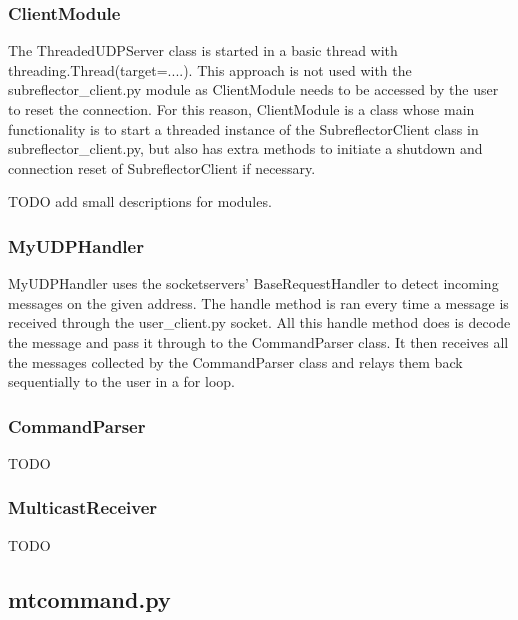 \documentclass{article}
\begin{document}
\subsubsection{ClientModule}
The ThreadedUDPServer class is started in a basic thread with threading.Thread(target=....). This approach is not used with the subreflector\_client.py  module as ClientModule needs to be accessed by the user to reset the connection. For this reason, ClientModule is a class whose main functionality is to start a threaded instance of the SubreflectorClient class in subreflector\_client.py, but also has extra methods to initiate a shutdown and connection reset of SubreflectorClient if necessary.

TODO add small descriptions for modules.  %

\subsubsection{MyUDPHandler}

MyUDPHandler uses the socketservers' BaseRequestHandler to detect incoming messages on the given address. The handle method is ran every time a message is received through the user\_client.py socket. All this handle method does is decode the message and pass it through to the CommandParser class. It then receives all the messages collected by the CommandParser class and relays them back sequentially to the user in a for loop.

\subsubsection{CommandParser}

TODO%


\subsubsection{MulticastReceiver}

TODO%




\newpage
\subsection{mtcommand.py}
\end{document}
